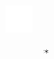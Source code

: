 \documentclass[10pt]{article}
\begin{document}
\includegraphics[max width=\textwidth, center]{2025_04_17_46e04c6acd873ea9558dg-142(7)}

\begin{verbatim}
        *
\end{verbatim}
\end{document}
